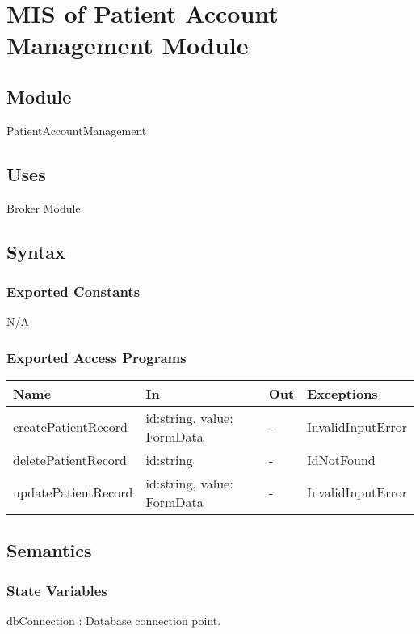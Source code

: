 \documentclass[12pt, titlepage]{article}
\begin{document}
\newpage

\section{MIS of Patient Account Management Module} \label{Module_PatientAccountManag}

\subsection{Module}
PatientAccountManagement

\subsection{Uses}
Broker Module\\

\subsection{Syntax}

\subsubsection{Exported Constants}
N/A

\subsubsection{Exported Access Programs}

\begin{center}
\begin{tabular}{p{4cm} p{4.5cm} p{1cm} p{2.5cm}}
\hline
\textbf{Name} & \textbf{In} & \textbf{Out} & \textbf{Exceptions} \\
\hline
createPatientRecord & id:string, value: FormData & - & InvalidInputError \\
deletePatientRecord & id:string & - & IdNotFound\\
updatePatientRecord & id:string, value: FormData & - & InvalidInputError \\
\hline
\end{tabular}
\end{center}

\subsection{Semantics}

\subsubsection{State Variables}
dbConnection : Database connection point.
\end{document}
